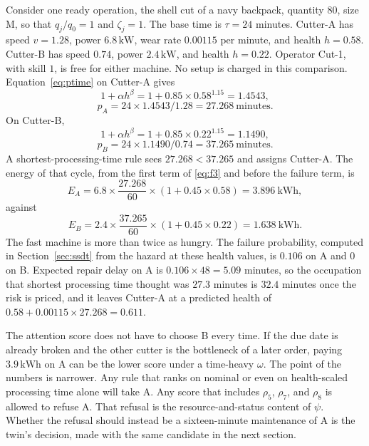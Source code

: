 Consider one ready operation, the shell cut of a navy backpack, quantity \(80\), size M, so that \(q_j/q_0 = 1\) and \(\zeta_j = 1\). The base time is \(\tau = 24\) minutes. Cutter-A has speed \(v = 1.28\), power \(6.8\,\mathrm{kW}\), wear rate \(0.00115\) per minute, and health \(h = 0.58\). Cutter-B has speed \(0.74\), power \(2.4\,\mathrm{kW}\), and health \(h = 0.22\). Operator Cut-1, with skill \(1\), is free for either machine. No setup is charged in this comparison. Equation~\eqref{eq:ptime} on Cutter-A gives
\begin{equation}
1 + \alpha h^{\beta} = 1 + 0.85 \times 0.58^{1.15} = 1.4543 ,
\end{equation}
\begin{equation}
p_A = 24 \times 1.4543 / 1.28 = 27.268 \ \mathrm{minutes} .
\end{equation}
On Cutter-B,
\begin{equation}
1 + \alpha h^{\beta} = 1 + 0.85 \times 0.22^{1.15} = 1.1490 ,
\end{equation}
\begin{equation}
p_B = 24 \times 1.1490 / 0.74 = 37.265 \ \mathrm{minutes} .
\end{equation}
A shortest-processing-time rule sees \(27.268 < 37.265\) and assigns Cutter-A. The energy of that cycle, from the first term of \eqref{eq:f3} and before the failure term, is
\begin{equation}
E_A = 6.8 \times \frac{27.268}{60} \times (1 + 0.45 \times 0.58) = 3.896\ \mathrm{kWh} ,
\end{equation}
against
\begin{equation}
E_B = 2.4 \times \frac{37.265}{60} \times (1 + 0.45 \times 0.22) = 1.638\ \mathrm{kWh} .
\end{equation}
The fast machine is more than twice as hungry. The failure probability, computed in Section~\ref{sec:ssdt} from the hazard at these health values, is \(0.106\) on A and \(0\) on B. Expected repair delay on A is \(0.106 \times 48 = 5.09\) minutes, so the occupation that shortest processing time thought was \(27.3\) minutes is \(32.4\) minutes once the risk is priced, and it leaves Cutter-A at a predicted health of \(0.58 + 0.00115 \times 27.268 = 0.611\).

The attention score does not have to choose B every time. If the due date is already broken and the other cutter is the bottleneck of a later order, paying \(3.9\,\mathrm{kWh}\) on A can be the lower score under a time-heavy \(\omega\). The point of the numbers is narrower. Any rule that ranks on nominal or even on health-scaled processing time alone will take A. Any score that includes \(\rho_5\), \(\rho_7\), and \(\rho_8\) is allowed to refuse A. That refusal is the resource-and-status content of \(\psi\). Whether the refusal should instead be a sixteen-minute maintenance of A is the twin's decision, made with the same candidate in the next section.

